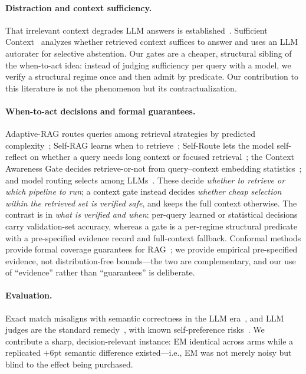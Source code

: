 \documentclass[11pt]{article}
\begin{document}
\paragraph{Distraction and context sufficiency.} That irrelevant context
degrades LLM answers is
established~\citep{shi2023distracted,liu2024lost,cuconasu2024power,yoran2024making}.
Sufficient Context~\citep{joren2025sufficient} analyzes whether retrieved
context suffices to answer and uses an LLM autorater for selective
abstention. Our gates are a cheaper, structural sibling of the when-to-act
idea: instead of judging sufficiency per query with a model, we verify a
structural regime once and then admit by predicate. Our contribution to
this literature is not the phenomenon but its contractualization.

\paragraph{When-to-act decisions and formal guarantees.} Adaptive-RAG
routes queries among retrieval strategies by predicted
complexity~\citep{jeong2024adaptive}; Self-RAG learns when to
retrieve~\citep{asai2024selfrag}; Self-Route lets the model self-reflect on
whether a query needs long context or focused
retrieval~\citep{li2024selfroute}; the Context Awareness Gate decides
retrieve-or-not from query--context embedding
statistics~\citep{heydari2024cag}; and model routing selects among
LLMs~\citep{ong2024routellm,chen2023frugalgpt}. These decide \emph{whether
to retrieve or which pipeline to run}; a context gate instead decides
\emph{whether cheap selection within the retrieved set is verified safe},
and keeps the full context otherwise. The contrast is in \emph{what is
verified and when}: per-query learned or statistical decisions carry
validation-set accuracy, whereas a gate is a per-regime structural
predicate with a pre-specified evidence record and full-context fallback.
Conformal methods provide formal coverage guarantees for
RAG~\citep{kang2024crag,li2024traq,mohri2024conformal}; we provide
empirical pre-specified evidence, not distribution-free bounds---the two
are complementary, and our use of ``evidence'' rather than ``guarantees''
is deliberate.

\paragraph{Evaluation.} Exact match misaligns with semantic correctness in
the LLM era~\citep{kamalloo2023evaluating}, and LLM judges are the standard
remedy~\citep{zheng2023judging}, with known self-preference
risks~\citep{panickssery2024llm}. We contribute a sharp, decision-relevant
instance: EM identical across arms while a replicated $+6$pt semantic
difference existed---i.e., EM was not merely noisy but blind to the effect
being purchased.
\end{document}

